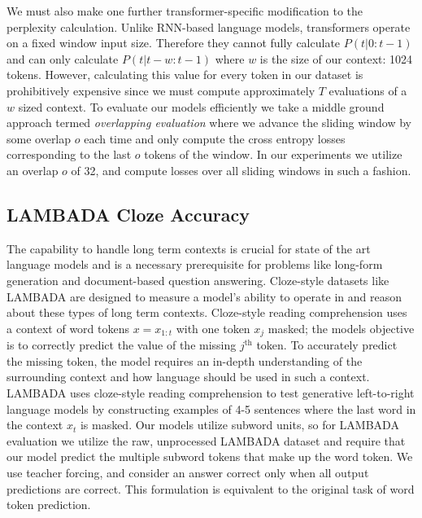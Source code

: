 We must also make one further transformer-specific modification to the perplexity calculation. Unlike RNN-based language models, transformers operate on a fixed window input size. Therefore they cannot fully calculate $P(t|0:t-1)$ and can only calculate $P(t|t-w:t-1)$ where $w$ is the size of our context: 1024 tokens. However, calculating this value for every token in our dataset is prohibitively expensive since we must compute approximately $T$ evaluations of a $w$ sized context. To evaluate our models efficiently we take a middle ground approach termed \textit{overlapping evaluation} where we advance the sliding window by some overlap $o$ each time and only compute the cross entropy losses corresponding to the last $o$ tokens of the window. In our experiments we utilize an overlap $o$ of 32, and compute losses over all sliding windows in such a fashion.


\subsection{LAMBADA Cloze Accuracy}
The capability to handle long term contexts is crucial for state of the art language models and is a necessary prerequisite for problems like long-form generation and
document-based question answering. Cloze-style datasets like LAMBADA are designed to measure a model's ability to operate in and reason about these types of long term contexts. Cloze-style reading comprehension uses a context of word tokens $x=x_{1:t}$ with one token $x_j$ masked; the models objective is to correctly predict the value of the missing $j^{\text{th}}$ token. To accurately predict the missing token, the model requires an in-depth understanding of the surrounding context and how language should be used in such a context. LAMBADA uses cloze-style reading comprehension to test generative left-to-right language models by constructing examples of 4-5 sentences where the last word in the context $x_t$ is masked. Our models utilize subword units, so for LAMBADA evaluation we utilize the raw, unprocessed LAMBADA dataset and require that our model predict the multiple subword tokens that make up the word token. We use teacher forcing, and consider an answer correct only when all output predictions are correct. This formulation is equivalent to the original task of word token prediction.



%
%

%